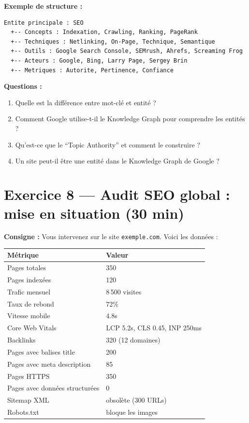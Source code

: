 \documentclass[12pt,a4paper]{report}
\begin{document}
\textbf{Exemple de structure :}
\begin{lstlisting}
Entite principale : SEO
  +-- Concepts : Indexation, Crawling, Ranking, PageRank
  +-- Techniques : Netlinking, On-Page, Technique, Semantique
  +-- Outils : Google Search Console, SEMrush, Ahrefs, Screaming Frog
  +-- Acteurs : Google, Bing, Larry Page, Sergey Brin
  +-- Metriques : Autorite, Pertinence, Confiance
\end{lstlisting}

\textbf{Questions :}
\begin{enumerate}
    \item Quelle est la diff\'{e}rence entre mot-cl\'{e} et entit\'{e} ?
    \item Comment Google utilise-t-il le Knowledge Graph pour comprendre les entit\'{e}s ?
    \item Qu'est-ce que le ``Topic Authority'' et comment le construire ?
    \item Un site peut-il \^{e}tre une entit\'{e} dans le Knowledge Graph de Google ?
\end{enumerate}

\section{Exercice 8 --- Audit SEO global : mise en situation (30 min)}

\textbf{Consigne :} Vous intervenez sur le site \texttt{exemple.com}. Voici les donn\'{e}es :

\begin{longtable}{ll}
\toprule
M\'{e}trique & Valeur \\
\midrule
\endhead
\bottomrule
\endfoot
Pages totales & 350 \\
Pages index\'{e}es & 120 \\
Trafic mensuel & 8\,500 visites \\
Taux de rebond & 72\% \\
Vitesse mobile & 4.8s \\
Core Web Vitals & LCP 5.2s, CLS 0.45, INP 250ms \\
Backlinks & 320 (12 domaines) \\
Pages avec balises title & 200 \\
Pages avec meta description & 85 \\
Pages HTTPS & 350 \\
Pages avec donn\'{e}es structur\'{e}es & 0 \\
Sitemap XML & obsol\`{e}te (300 URLs) \\
Robots.txt & bloque les images \\
\bottomrule
\end{longtable}
\end{document}
